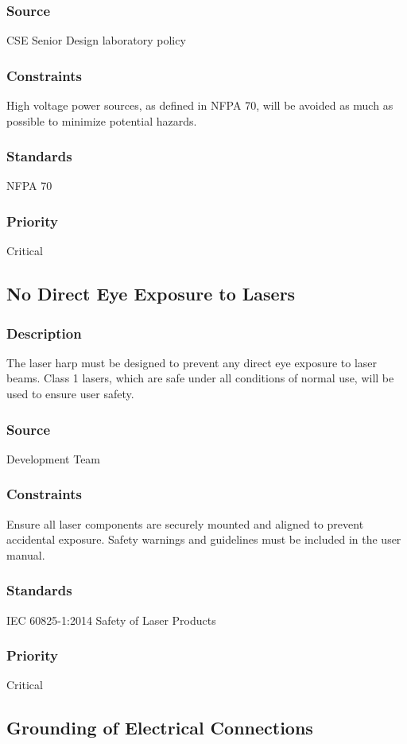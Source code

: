 \subsubsection{Source}
CSE Senior Design laboratory policy
\subsubsection{Constraints}
High voltage power sources, as defined in NFPA 70, will be avoided as much as possible to minimize potential hazards.
\subsubsection{Standards}
NFPA 70
\subsubsection{Priority}
Critical

\subsection{No Direct Eye Exposure to Lasers}
\subsubsection{Description}
The laser harp must be designed to prevent any direct eye exposure to laser beams. Class 1 lasers, which are safe under all conditions of normal use, will be used to ensure user safety.
\subsubsection{Source}
Development Team
\subsubsection{Constraints}
Ensure all laser components are securely mounted and aligned to prevent accidental exposure. Safety warnings and guidelines must be included in the user manual.
\subsubsection{Standards}
IEC 60825-1:2014 Safety of Laser Products
\subsubsection{Priority}
Critical

\subsection{Grounding of Electrical Connections}
